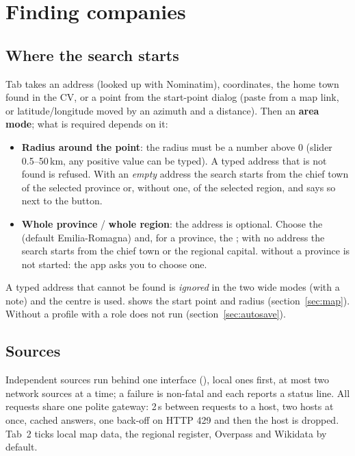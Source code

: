 \chapter{Finding companies}\label{ch:discovery}

\section{Where the search starts}
Tab  takes an address (looked up with Nominatim),
coordinates, the home town found in the CV, or a point from the start-point dialog
(paste from a map link, or latitude/longitude moved by an azimuth and a distance).
Then an \textbf{area mode}; what is required depends on it:

\begin{itemize}
  \item \textbf{Radius around the point}: the radius must be a number above 0 (slider 0.5--50\,km, any positive value
        can be typed). A typed address that is not found is refused. With an \emph{empty} address the search starts
        from the chief town of the selected province or, without one, of the selected region, and says so next to
        the button.
  \item \textbf{Whole province} / \textbf{whole region}: the address is optional. Choose the  (default
        Emilia-Romagna) and, for a province, the ; with no address the search starts from the chief town
        or the regional capital.  without a province is not started: the app asks you to choose one.
\end{itemize}


A typed address that cannot be found is \emph{ignored} in the two wide modes (with a note) and the centre is
used.  shows the start point and
radius (section~\ref{sec:map}). Without a profile with a role  does not run (section~\ref{sec:autosave}).

\section{Sources}
Independent sources run behind one interface (), local ones first, at most two
network sources at a time; a failure is non-fatal and each reports a status line. All requests share one polite gateway: 2\,s between requests to a host, two hosts at once, cached answers, one back-off on HTTP 429 and then the host is dropped. Tab~2 ticks local map data, the
regional register, Overpass and Wikidata by default.

